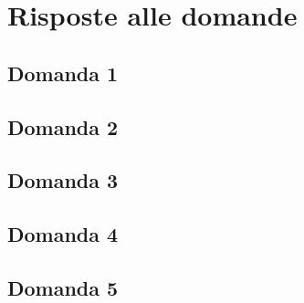 \section{Risposte alle domande}

\subsection{Domanda 1}

\subsection{Domanda 2}

\subsection{Domanda 3}

\subsection{Domanda 4}

\subsection{Domanda 5}
